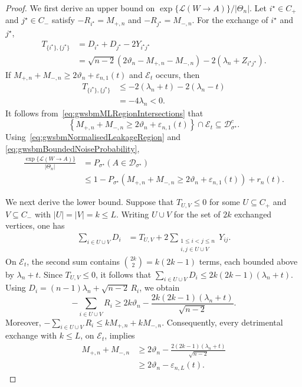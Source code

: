 \documentclass[11pt]{article}
\theoremstyle{definition}
\theoremstyle{remark}
\newcommand{\1}{\boldsymbol{1}}
\newcommand{\ml}[2]{\mathcal{L}(#1\!\to\!#2)}
\begin{document}
\begin{proof}
We first derive an upper bound on
$\exp\{\ml{W}{A}\}/|\Theta_n|$. Let
$i^\star\in C_+$ and $j^\star\in C_-$ satisfy
\(-R_{i^\star}=M_{+,n}\) and \(-R_{j^\star}=M_{-,n}\).
For the exchange of $i^\star$ and $j^\star$,
\begin{align}
T_{\{i^\star\},\{j^\star\}}
&=
D_{i^\star}+D_{j^\star}-2Y_{i^\star j^\star}\\
&=
\sqrt{n-2}
\left(
2\vartheta_n-M_{+,n}-M_{-,n}
\right)
-
2\left(
\lambda_n+Z_{i^\star j^\star}
\right).
\label{eq:gwsbmMostDetrimentalOneExchange}
\end{align}
If \(M_{+,n}+M_{-,n}\geq
2\vartheta_n+\varepsilon_{n,1}(t)\) and $\mathcal E_t$ occurs, then
\begin{align}
T_{\{i^\star\},\{j^\star\}}
&\leq
-2(\lambda_n+t)
-
2(\lambda_n-t)\\
&=
-4\lambda_n
<
0.
\end{align}
It follows from~\eqref{eq:gwsbmMLRegionIntersections} that
\begin{equation}
\left\{
M_{+,n}+M_{-,n}
\geq
2\vartheta_n+\varepsilon_{n,1}(t)
\right\}
\cap
\mathcal E_t
\subseteq
\mathcal D_{\sigma^\star}^c.
\label{eq:gwsbmLeakageUpperInclusion}
\end{equation}
Using~\eqref{eq:gwsbmNormalisedLeakageRegion} and
\eqref{eq:gwsbmBoundedNoiseProbability},
\begin{align}
\frac{\exp\{\ml{W}{A}\}}{|\Theta_n|}
&=
P_{\sigma^\star}
\left(
A\in\mathcal D_{\sigma^\star}
\right)\\
&\leq
1-
P_{\sigma^\star}
\left(
M_{+,n}+M_{-,n}
\geq
2\vartheta_n+\varepsilon_{n,1}(t)
\right)
+r_n(t).
\label{eq:gwsbmLeakageUpperBound}
\end{align}

We next derive the lower bound. Suppose that
$T_{U,V}\leq0$ for some \(U\subseteq C_+\) and \(V\subseteq C_-\)
with \(|U|=|V|=k\leq L\).
Writing $U\cup V$ for the set of $2k$ exchanged vertices, one has
\begin{align}
\sum_{i\in U\cup V}D_i
&=
T_{U,V}
+
2
\sum_{\substack{1\leq i<j\leq n\\
i,j\in U\cup V}}
Y_{ij}.
\label{eq:gwsbmVertexScoreDecomposition}
\end{align}
On $\mathcal E_t$, the second sum contains
\(\binom{2k}{2}=k(2k-1)\) terms, each bounded above by
$\lambda_n+t$. Since $T_{U,V}\leq0$, it follows that
\(\sum_{i\in U\cup V}D_i\leq2k(2k-1)(\lambda_n+t)\).
Using \(D_i=(n-1)\lambda_n+\sqrt{n-2}\,R_i\),
we obtain
\begin{equation}
-\sum_{i\in U\cup V}R_i
\geq
2k\vartheta_n
-
\frac{
2k(2k-1)(\lambda_n+t)
}{
\sqrt{n-2}
}.
\label{eq:gwsbmDetrimentalSmallExchangeLower}
\end{equation}
Moreover,
\(-\sum_{i\in U\cup V}R_i\leq kM_{+,n}+kM_{-,n}\).
Consequently, every detrimental exchange with $k\leq L$, on
$\mathcal E_t$, implies
\begin{align}
M_{+,n}+M_{-,n}
&\geq
2\vartheta_n
-
\frac{
2(2k-1)(\lambda_n+t)
}{
\sqrt{n-2}
}\\
&\geq
2\vartheta_n-\varepsilon_{n,L}(t).
\label{eq:gwsbmSmallExchangeImplication}
\end{align}


\end{proof}
\end{document}
